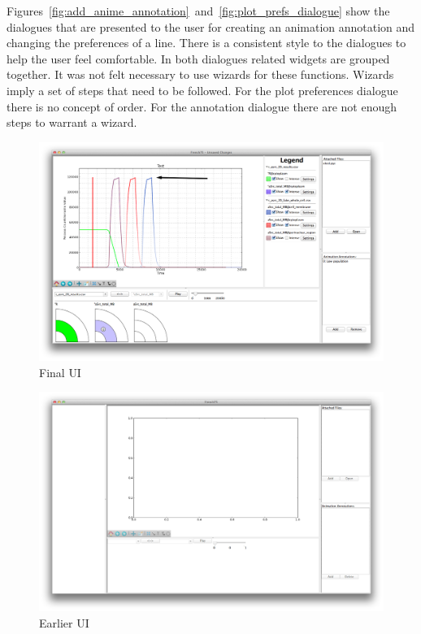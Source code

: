 Figures~\ref{fig:add_anime_annotation}~and~\ref{fig:plot_prefs_dialogue} show the dialogues that are presented to the user for creating an animation annotation and changing the preferences of a line.  There is a consistent style to the dialogues to help the user feel comfortable.  In both dialogues related widgets are grouped together.  It was not felt necessary to use wizards for these functions.  Wizards imply a set of steps that need to be followed.  For the plot preferences dialogue there is no concept of order.  For the annotation dialogue there are not enough steps to warrant a wizard.

\begin{figure}[h!]
    \centering
    \includegraphics[width=\textwidth]{images/main_ui.png}
    \caption{Final \ac{UI}}
    \label{fig:main_ui}
\end{figure}

\begin{figure}[h!]
    \centering
    \includegraphics[width=\textwidth]{images/old_ui.png}
    \caption{Earlier \ac{UI}}
    \label{fig:old_ui}
\end{figure}

